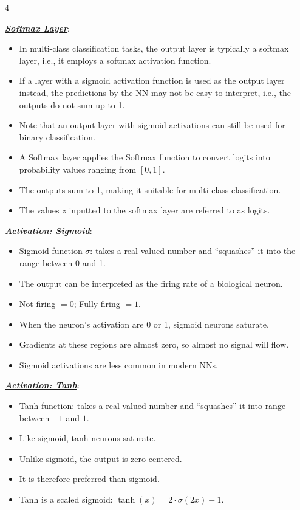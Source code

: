 \documentclass[12pt]{article}
\newcommand{\bulletPoint}[1]{\ul{\textit{\textbf{#1}}}}
\begin{document}
\singlespacing
\begin{multicols*}{4}
\tiny
\raggedright

\bulletPoint{Softmax Layer}:
\begin{itemize}
\item In multi-class classification tasks, the output layer is typically a softmax layer, i.e., it employs a softmax activation function.
\item If a layer with a sigmoid activation function is used as the output layer instead, the predictions by the NN may not be easy to interpret, i.e., the outputs do not sum up to 1.
\item Note that an output layer with sigmoid activations can still be used for binary classification.
\item A Softmax layer applies the Softmax function to convert logits into probability values ranging from $[0,1]$.
\item The outputs sum to 1, making it suitable for multi-class classification.
\item The values $z$ inputted to the softmax layer are referred to as logits.
\end{itemize}

\bulletPoint{Activation: Sigmoid}:
\begin{itemize}
\item Sigmoid function $\sigma$: takes a real-valued number and ``squashes'' it into the range between 0 and 1.
\item The output can be interpreted as the firing rate of a biological neuron.
\item Not firing $=0$; Fully firing $=1$.
\item When the neuron's activation are 0 or 1, sigmoid neurons saturate.
\item Gradients at these regions are almost zero, so almost no signal will flow.
\item Sigmoid activations are less common in modern NNs.
\end{itemize}

\bulletPoint{Activation: Tanh}:
\begin{itemize}
\item Tanh function: takes a real-valued number and ``squashes'' it into range between $-1$ and $1$.
\item Like sigmoid, tanh neurons saturate.
\item Unlike sigmoid, the output is zero-centered.
\item It is therefore preferred than sigmoid.
\item Tanh is a scaled sigmoid: $\tanh(x)=2\cdot \sigma(2x)-1$.
\end{itemize}


\end{multicols*}
\end{document}
